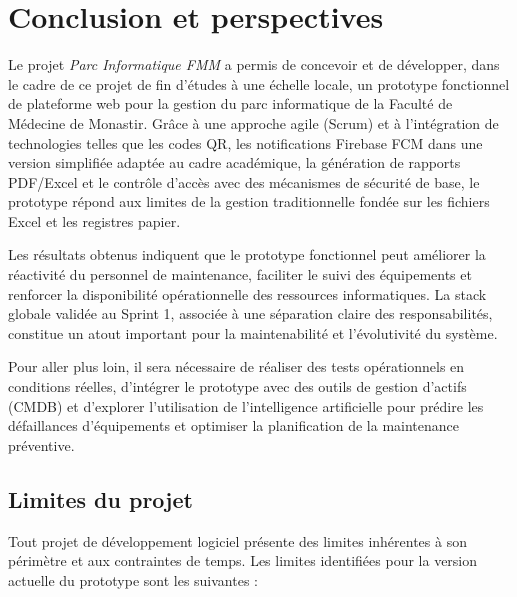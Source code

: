 \chapter*{Conclusion et perspectives}
\label{chap:conclusion}
\setcounter{chapter}{8}
\setcounter{section}{0}

Le projet \textit{Parc Informatique FMM} a permis de concevoir et de développer, dans le cadre de ce projet de fin d’études à une échelle locale, un prototype fonctionnel de plateforme web pour la gestion du parc informatique de la Faculté de Médecine de Monastir. Grâce à une approche agile (Scrum) et à l'intégration de technologies telles que les codes QR, les notifications Firebase FCM dans une version simplifiée adaptée au cadre académique, la génération de rapports PDF/Excel et le contrôle d'accès avec des mécanismes de sécurité de base, le prototype répond aux limites de la gestion traditionnelle fondée sur les fichiers Excel et les registres papier.

Les résultats obtenus indiquent que le prototype fonctionnel peut améliorer la réactivité du personnel de maintenance, faciliter le suivi des équipements et renforcer la disponibilité opérationnelle des ressources informatiques. La stack globale validée au Sprint 1, associée à une séparation claire des responsabilités, constitue un atout important pour la maintenabilité et l'évolutivité du système.

Pour aller plus loin, il sera nécessaire de réaliser des tests opérationnels en conditions réelles, d'intégrer le prototype avec des outils de gestion d'actifs (CMDB) et d'explorer l'utilisation de l'intelligence artificielle pour prédire les défaillances d'équipements et optimiser la planification de la maintenance préventive.

\section*{Limites du projet}
\label{sec:limites_projet}

Tout projet de développement logiciel présente des limites inhérentes à son périmètre et aux contraintes de temps. Les limites identifiées pour la version actuelle du prototype sont les suivantes :

